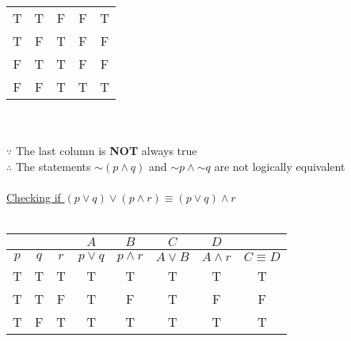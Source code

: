\documentclass[a4paper,12pt]{article}
\newcommand*{\ltnot}{\mathord{\sim}}
\begin{document}
\begin{center}
{\begin{tabular}{|c c| c | c | c|}
        \hline
        T                    & T                       & F                       & F                         & T            \\
        T                    & F                       & T                       & F                         & F            \\
        F                    & T                       & T                       & F                         & F            \\
        F                    & F                       & T                       & T                         & T            \\
        \hline
    \end{tabular}}
    \ \\\ \\
    $\because$ The last column is \textbf{NOT} always true\\
    $\therefore$ The statements $\ltnot (p \land q)$ and $\ltnot p \land \ltnot q$ are not logically equivalent\\\ \\
    \ul{Checking if $(p \lor q) \lor (p \land r) \equiv (p \lor q) \land r$}\\\ \\
    {
    \begin{tabular}{|c c c|c|c|c|c|c|}
        \multicolumn{3}{c}{} & \multicolumn{1}{c}{$A$} & \multicolumn{1}{c}{$B$} & \multicolumn{1}{c}{$C$} & \multicolumn{1}{c}{$D$} & \multicolumn{1}{c}{}                              \\
        \hline
        $p$                  & $q$                     & $r$                     & $p \lor q$              & $p \land r$             & $A \lor B$           & $A \land r$ & $C \equiv D$ \\
        \hline
        T                    & T                       & T                       & T                       & T                       & T                    & T           & T            \\
        \hline
        T                    & T                       & F                       & T                       & F                       & T                    & F           & F            \\
        \hline
        T                    & F                       & T                       & T                       & T                       & T                    & T           & T            \\

\end{tabular}}
\end{center}
\end{document}
